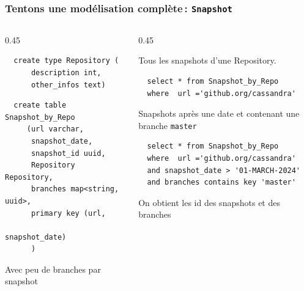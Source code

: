 \begin{frame}[fragile] \frametitle{Tentons une modélisation complète\,: \texttt{Snapshot}}


\begin{columns}
    \begin{column}{0.45\textwidth}
     
  \begin{verbatim}
  create type Repository (
      description int,
      other_infos text)
  \end{verbatim}
    
    \vfill
  \begin{verbatim}
  create table Snapshot_by_Repo
     (url varchar, 
      snapshot_date,
      snapshot_id uuid,
      Repository Repository,
      branches map<string, uuid>,
      primary key (url, 
                   snapshot_date)  
      )
  \end{verbatim}
  Avec peu de branches par snapshot
   \end{column}
 \begin{column}{0.45\textwidth}

  Tous les snapshots d'une Repository.
  
  \vfill
  
  \begin{verbatim}
  select * from Snapshot_by_Repo
  where  url ='github.org/cassandra'
  \end{verbatim}
  
   \vfill
   Snapshots après une date et contenant une branche \texttt{master}
   
 \begin{verbatim}
  select * from Snapshot_by_Repo
  where  url ='github.org/cassandra'
  and snapshot_date > '01-MARCH-2024'
  and branches contains key 'master'
  \end{verbatim}

\vfill 
  On obtient les id des snapshots et des branches
\end{column}
\end{columns}
	
\end{frame}
	
